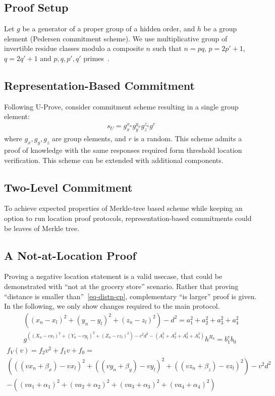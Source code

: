 \documentclass{article}
\begin{document}
\subsection{Proof Setup}

Let $g$ be a generator of a proper group of a hidden order,
and $h$ be a group element (Pedersen commitment scheme).
We use multiplicative group of invertible residue classes modulo a composite $n$ such that
$n=pq$, $p=2p'+1$, $q=2q'+1$ and $p, q, p', q'$ primes~\cite{Idemix}.

\subsection{Representation-Based Commitment}
Following U-Prove, consider commitment scheme resulting in a single group element:
\begin{gather}
\label{cmt-up-cp}
  s_U = g_x^{x_n} g_y^{y_n} g_z^{z_n} g^{r}
\end{gather}
where $g_x, g_y, g_z$ are group elements, and $r$ is a random.
This scheme admits a proof of knowledge with the same responses required form threshold location verification.
This scheme can be extended with additional components. %

\subsection{Two-Level Commitment}
To achieve expected properties of Merkle-tree based scheme while keeping an option
to run location proof protocols,
representation-based commitments could be leaves of Merkle tree.

\subsection{A Not-at-Location Proof}

Proving a negative location statement is a valid usecase,
that could be demonstrated with ``not at the grocery store'' scenario.
Rather that proving ``distance is smaller than''~\eqref{eq-distn-cp},
complementary ``is larger'' proof is given. %
In the following, we only show changes required to the main protocol.
\begin{gather}
\label{eq-distn-more}
  ((x_n - x_l)^2 + (y_n - y_l)^2 + (z_n - z_l)^2) - d^2 = a_1^2 + a_2^2 + a_3^2 + a_4^2  \\
\label{verf-distn-more}
  g^{((X_n - c x_l)^2 + (Y_n - c y_l)^2 + (Z_n - c z_l)^2 ) - c^2 d^2 - (A_1^2 + A_2^2 + A_3^2 + A_4^2)} h^{R_a} = b_1^{c} b_0 
\end{gather}
\begin{multline}
\label{eq-coeff-more}
  f_V(v) = f_2 v^2 + f_1 v + f_0 = \\
  (((v x_n + \beta_x) - v x_l)^2 +
   ((v y_n + \beta_y) - v y_l)^2 +
   ((v z_n + \beta_z) - v z_l)^2)
  - v^2 d^2 \\
  - ((v a_1 + \alpha_1)^2 +
     (v a_2 + \alpha_2)^2 +
     (v a_3 + \alpha_3)^2 +
     (v a_4 + \alpha_4)^2)
\end{multline}
\end{document}
